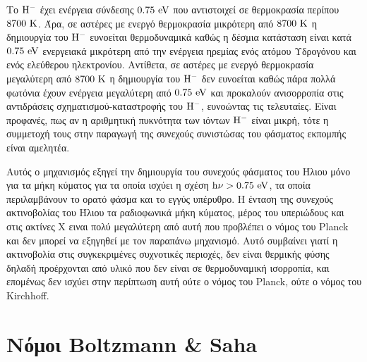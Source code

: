 Το $\rm H^{-}$ έχει ενέργεια σύνδεσης $\rm 0.75 \ eV$ που αντιστοιχεί σε θερμοκρασία περίπου $\rm 8700 \ K$. Άρα, σε αστέρες με ενεργό θερμοκρασία μικρότερη από $\rm 8700 \ K$ η δημιουργία του $\rm H^{-}$ ευνοείται θερμοδυναμικά καθώς η δέσμια κατάσταση είναι κατά $\rm 0.75 \ eV$ ενεργειακά μικρότερη από την ενέργεια ηρεμίας ενός ατόμου Υδρογόνου και ενός ελεύθερου ηλεκτρονίου. Αντίθετα, σε αστέρες με ενεργό θερμοκρασία μεγαλύτερη από $\rm 8700 \ K$ η δημιουργία του $\rm H^{-}$ δεν ευνοείται καθώς πάρα πολλά φωτόνια έχουν ενέργεια μεγαλύτερη από $\rm 0.75 \ eV$ και προκαλούν ανισορροπία στις αντιδράσεις σχηματισμού-καταστροφής του $\rm H^{-}$, ευνοώντας τις τελευταίες. Είναι προφανές, πως αν η αριθμητική πυκνότητα των ιόντων $\rm H^{-}$ είναι μικρή, τότε η συμμετοχή τους στην παραγωγή της συνεχούς συνιστώσας του φάσματος εκπομπής είναι αμελητέα.

Αυτός ο μηχανισμός εξηγεί την δημιουργία του συνεχούς φάσματος του Ήλιου μόνο για τα μήκη κύματος για τα οποία ισχύει η σχέση $\rm h\nu > 0.75 \ eV$, τα οποία περιλαμβάνουν το ορατό φάσμα και το εγγύς υπέρυθρο. Η ένταση της συνεχούς ακτινοβολίας του Ήλιου τα ραδιοφωνικά μήκη κύματος, μέρος του υπεριώδους και στις ακτίνες Χ ειναι πολύ μεγαλύτερη από αυτή που προβλέπει ο νόμος του Planck και δεν μπορεί να εξηγηθεί με τον παραπάνω μηχανισμό. Αυτό συμβαίνει γιατί η ακτινοβολία στις συγκεκριμένες συχνοτικές περιοχές, δεν είναι θερμικής φύσης δηλαδή προέρχονται από υλικό που δεν είναι σε θερμοδυναμική ισορροπία, και επομένως δεν ισχύει στην περίπτωση αυτή ούτε ο νόμος του Planck, ούτε ο νόμος του Kirchhoff.



\section{Νόμοι Boltzmann \& Saha}
